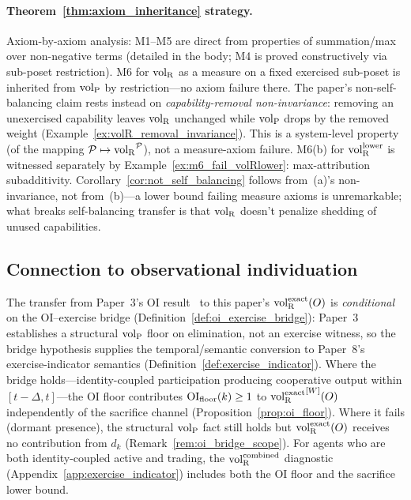 \paragraph{Theorem~\ref{thm:axiom_inheritance} strategy.}
Axiom-by-axiom analysis:
M1--M5 are direct from properties of summation/max over
non-negative terms (detailed in the body; M4 is proved
constructively via sub-poset restriction).
M6 for ${\operatorname{vol}_{\mathrm{R}}}$ as a measure on a fixed exercised sub-poset is
inherited from ${\operatorname{vol}_{\mathrm{P}}}$ by restriction---no axiom failure there.
The paper's non-self-balancing claim rests instead on
\emph{capability-removal non-invariance}: removing an
unexercised capability leaves ${\operatorname{vol}_{\mathrm{R}}}$ unchanged while ${\operatorname{vol}_{\mathrm{P}}}$
drops by the removed weight
(Example~\ref{ex:volR_removal_invariance}).  This is a
system-level property (of the mapping
$\mathcal{P} \mapsto {\operatorname{vol}_{\mathrm{R}}}^{\mathcal{P}}$), not a measure-axiom
failure.  M6(b) for ${\operatorname{vol}_{\mathrm{R}}^{\mathrm{lower}}}$ is witnessed separately by
Example~\ref{ex:m6_fail_volRlower}: max-attribution
subadditivity.  Corollary~\ref{cor:not_self_balancing} follows
from~(a)'s non-invariance, not from~(b)---a lower bound failing
measure axioms is unremarkable; what breaks self-balancing
transfer is that ${\operatorname{vol}_{\mathrm{R}}}$ doesn't penalize shedding of unused
capabilities.

\subsection{Connection to observational individuation}

The transfer from Paper~3's OI
result~\citep[Corollary~2.1]{lasser2026horizon} to this paper's
${\operatorname{vol}_{\mathrm{R}}^{\mathrm{exact}}}(O)$ is \emph{conditional} on the OI--exercise
bridge (Definition~\ref{def:oi_exercise_bridge}): Paper~3
establishes a structural ${\operatorname{vol}_{\mathrm{P}}}$ floor on elimination, not an
exercise witness, so the bridge hypothesis supplies the
temporal/semantic conversion to Paper~8's exercise-indicator
semantics (Definition~\ref{def:exercise_indicator}).  Where the
bridge holds---identity-coupled participation producing
cooperative output within $[t-\Delta, t]$---the OI floor
contributes $\mathrm{OI}_{\mathrm{floor}}(k) \geq 1$ to ${\operatorname{vol}_{\mathrm{R}}^{\mathrm{exact}}}^{[W]}(O)$
independently of the sacrifice channel
(Proposition~\ref{prop:oi_floor}).  Where it fails (dormant
presence), the structural ${\operatorname{vol}_{\mathrm{P}}}$ fact still holds but
${\operatorname{vol}_{\mathrm{R}}^{\mathrm{exact}}}(O)$ receives no contribution from $d_k$
(Remark~\ref{rem:oi_bridge_scope}).  For agents who are both
identity-coupled active and trading, the ${\operatorname{vol}_{\mathrm{R}}^{\mathrm{combined}}}$ diagnostic
(Appendix~\ref{app:exercise_indicator}) includes both the OI
floor and the sacrifice lower bound.
